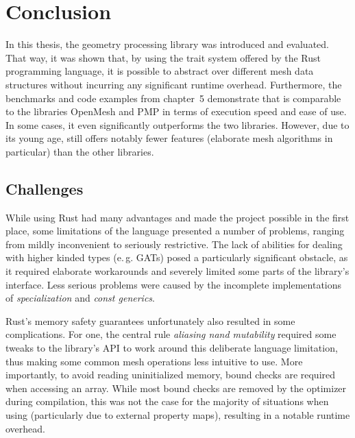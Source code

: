 \chapter{Conclusion}

In this thesis, the geometry processing library  was introduced and evaluated.
That way, it was shown that, by using the trait system offered by the Rust programming language,  it is possible to abstract over different mesh data structures without incurring any significant runtime overhead.
Furthermore, the benchmarks and code examples from chapter~5 demonstrate that  is comparable to the \cpp libraries OpenMesh and PMP in terms of execution speed and ease of use.
In some cases, it even significantly outperforms the two \cpp libraries.
However, due to its young age,  still offers notably fewer features (elaborate mesh algorithms in particular) than the other libraries.



\vfill
\section{Challenges}

While using Rust had many advantages and made the project possible in the first place, some limitations of the language presented a number of problems, ranging from mildly inconvenient to seriously restrictive.
The lack of abilities for dealing with higher kinded types (e.\,g. GATs) posed a particularly significant obstacle, as it required elaborate workarounds and severely limited some parts of the library's interface.
Less serious problems were caused by the incomplete implementations of \emph{specialization} and \emph{const generics}.

Rust's memory safety guarantees unfortunately also resulted in some complications.
For one, the central rule \emph{aliasing nand mutability} required some tweaks to the library's API to work around this deliberate language limitation, thus making some common mesh operations less intuitive to use.
More importantly, to avoid reading uninitialized memory, bound checks are required when accessing an array.
While most bound checks are removed by the optimizer during compilation, this was not the case for the majority of situations when using  (particularly due to external property maps), resulting in a notable runtime overhead.

